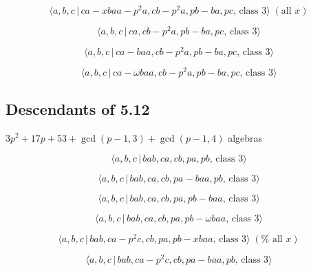 \documentclass[10pt]{article}
\begin{document}
\begin{equation}
\langle a,b,c\,|\,ca-xbaa-p^2a,cb-p^2a,pb-ba,pc,\,\text{class }3\rangle \;(%
\text{all }x)  \tag{7.681}
\end{equation}

\begin{equation}
\langle a,b,c\,|\,ca,cb-p^2a,pb-ba,pc,\,\text{class }3\rangle  \tag{7.682}
\end{equation}

\begin{equation}
\langle a,b,c\,|\,ca-baa,cb-p^2a,pb-ba,pc,\,\text{class }3\rangle 
\tag{7.683}
\end{equation}

\begin{equation}
\langle a,b,c\,|\,ca-\omega baa,cb-p^{2}a,pb-ba,pc,\,\text{class }3\rangle 
\tag{7.684}
\end{equation}

\subsection{Descendants of 5.12}

$3p^{2}+17p+53+\gcd (p-1,3)+\gcd (p-1,4)$ algebras

\begin{equation}
\langle a,b,c\,|\,bab,ca,cb,pa,pb,\,\text{class }3\rangle  \tag{7.685}
\end{equation}

\begin{equation}
\langle a,b,c\,|\,bab,ca,cb,pa-baa,pb,\,\text{class }3\rangle  \tag{7.686}
\end{equation}

\begin{equation}
\langle a,b,c\,|\,bab,ca,cb,pa,pb-baa,\,\text{class }3\rangle  \tag{7.687}
\end{equation}

\begin{equation}
\langle a,b,c\,|\,bab,ca,cb,pa,pb-\omega baa,\,\text{class }3\rangle 
\tag{7.688}
\end{equation}

\begin{equation}
\langle a,b,c\,|\,bab,ca-p^2c,cb,pa,pb-xbaa,\,\text{class }3\rangle \;(\text{%
all }x)  \tag{7.689}
\end{equation}

\begin{equation}
\langle a,b,c\,|\,bab,ca-p^2c,cb,pa-baa,pb,\,\text{class }3\rangle 
\tag{7.690}
\end{equation}
\end{document}
